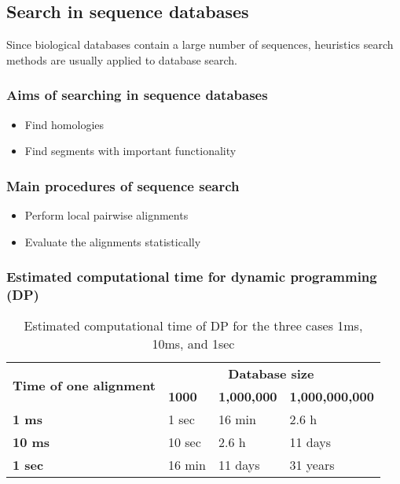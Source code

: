 %
%

%
%
\subsection{Search in sequence databases}
Since biological databases contain a large number of sequences, heuristics search methods are usually applied to database search.

%
%
\subsubsection*{Aims of searching in sequence databases} 
\begin{itemize}
\item Find homologies 
\item Find segments with important functionality
\end{itemize}

%
%
\subsubsection*{Main procedures of sequence search} 
\begin{itemize}
\item Perform local pairwise alignments
\item Evaluate the alignments statistically
\end{itemize}

%
%
\subsubsection*{Estimated computational time for dynamic programming (DP)} 
\begin{table}[h]
\centering
\caption{Estimated computational time of DP for the three cases 1ms, 10ms, and 1sec}
\begin{tabular}{|l|lll|}
\hline
\multirow{2}{*}{\textbf{Time of one alignment}} & \multicolumn{3}{c|}{\textbf{Database size}}                 \\ \cline{2-4} 
                                                & \textbf{1000} & \textbf{1,000,000} & \textbf{1,000,000,000} \\ \hline
\textbf{1 ms}                                   & 1 sec         & 16 min             & 2.6 h                  \\ 
\textbf{10 ms}                                  & 10 sec        & 2.6 h              & 11 days                \\ 
\textbf{1 sec}                                  & 16 min        & 11 days            & 31 years               \\ \hline
\end{tabular}
\end{table}

